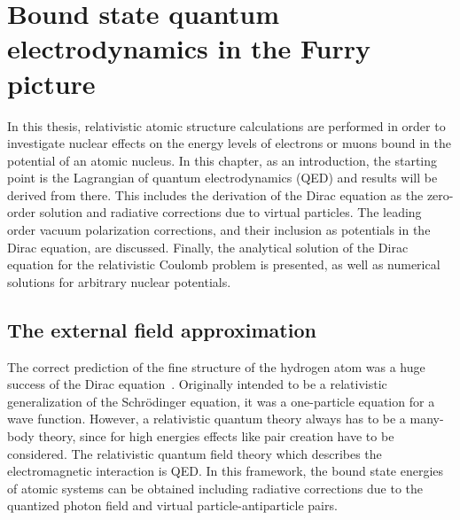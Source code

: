 \chapter{Bound state quantum electrodynamics in the Furry picture}
\label{ch:furry_pic}
In this thesis, relativistic atomic structure calculations are performed in order to investigate nuclear effects on the energy levels of electrons or muons bound in the potential of an atomic nucleus. In this chapter, as an introduction, the starting point is the Lagrangian of quantum electrodynamics (QED) and results will be derived from there. This includes the derivation of the Dirac equation as the zero-order solution and radiative corrections due to virtual particles. The leading order vacuum polarization corrections, and their inclusion as potentials in the Dirac equation, are discussed. Finally, the analytical solution of the Dirac equation for the relativistic Coulomb problem is presented, as well as numerical solutions for arbitrary nuclear potentials.
%
\section{The external field approximation}
\label{sec:ext_field}
The correct prediction of the fine structure of the hydrogen atom was a huge success of the Dirac equation~\cite{dirac1928}. Originally intended to be a relativistic generalization of the Schrödinger equation, it was a one-particle equation for a wave function. 
However, a relativistic quantum theory always has to be a many-body theory, since for high energies effects like pair creation have to be considered. The relativistic quantum field theory which describes the electromagnetic interaction is QED. In this framework, the bound state energies of atomic systems can be obtained including radiative corrections due to the quantized photon field and virtual particle-antiparticle pairs. 

